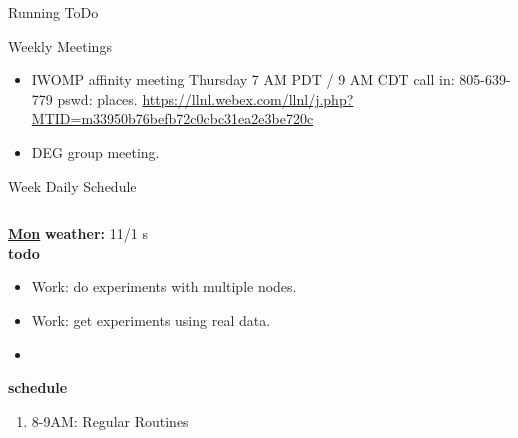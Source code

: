 \begin{columns}
\begin{column}{0.6\linewidth}
\begin{block}{Running ToDo}
\begin{enumerate}
      \end{enumerate}
    \end{block}
  
  \begin{block}{Weekly Meetings}
    \begin{itemize}
      \tiny \item \tiny IWOMP affinity meeting Thursday 7 AM PDT / 9 AM
      CDT call in: 805-639-779 pswd: places. \url{https://llnl.webex.com/llnl/j.php?MTID=m33950b76befb72c0cbc31ea2e3be720c}
    \item \tiny DEG group meeting.          \end{itemize}
  \end{block} 
      \begin{block}{Week Daily Schedule}
        \begin{columns}
          \begin{column}{0.14\textwidth}{\small \underline{\bf Mon}}
            {\tiny \bf {\tiny weather:} } {\tiny 11/1 s} \\ 
            {\tiny \bf {\tiny todo}}\\ 
            \begin{itemize}
              \tiny \item \tiny Work: do experiments with multiple nodes. 
            \item \tiny Work: get experiments using real data.  
            \item \tiny 
            \end{itemize}
                {\small  \bf schedule}\\
                \begin{enumerate} 
                  \tiny \item \tiny 8-9AM: Regular Routines 
                \end{enumerate}
          \end{column}


\end{columns}
\end{block}
\end{column}
\end{columns}
